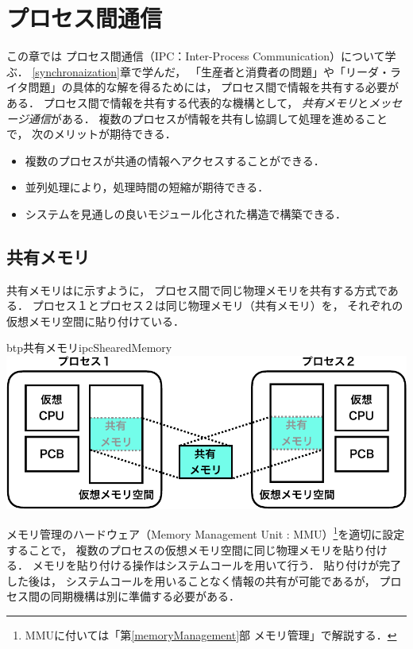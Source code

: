 \chapter{プロセス間通信}
\label{interProcessCommunication}
この章では
プロセス間通信（IPC：Inter-Process Communication）について学ぶ．
\ref{synchronaization}章で学んだ，
「生産者と消費者の問題」や「リーダ・ライタ問題」の具体的な解を得るためには，
プロセス間で情報を共有する必要がある．
プロセス間で情報を共有する代表的な機構として，
\emph{共有メモリ}と\emph{メッセージ通信}がある．
複数のプロセスが情報を共有し協調して処理を進めることで，
次のメリットが期待できる．

\begin{itemize}
\item 複数のプロセスが共通の情報へアクセスすることができる．
\item 並列処理により，処理時間の短縮が期待できる．
\item システムを見通しの良いモジュール化された構造で構築できる．
\end{itemize}

\section{共有メモリ}
共有メモリはに示すように，
プロセス間で同じ物理メモリを共有する方式である．
プロセス１とプロセス２は同じ物理メモリ（共有メモリ）を，
それぞれの仮想メモリ空間に貼り付けている．

\begin{myfig}{btp}{共有メモリ}{ipcShearedMemory}
  \includegraphics[scale=0.6]{Fig/ipcShearedMemory-crop.pdf}
\end{myfig}

メモリ管理のハードウェア（Memory Management Unit : MMU）\footnote{
  MMUに付いては「第\ref{memoryManagement}部 メモリ管理」で解説する．
}を適切に設定することで，
複数のプロセスの仮想メモリ空間に同じ物理メモリを貼り付ける．
メモリを貼り付ける操作はシステムコールを用いて行う．
貼り付けが完了した後は，
システムコールを用いることなく情報の共有が可能であるが，
プロセス間の同期機構は別に準備する必要がある．

